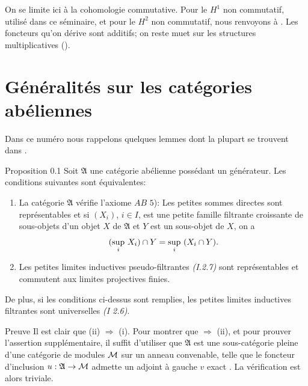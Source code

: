 \documentclass[10pt]{../fichiers-configuration-latex/smfart}
\begin{document}
On se limite ici à la cohomologie commutative. Pour le $H^1$ non
commutatif, utilisé dans ce séminaire, et pour le $H^2$ non
commutatif, nous renvoyons à \cite{SGA4-05:9}. Les foncteurs qu'on dérive sont
additifs; on reste muet sur les structures multiplicatives (\cf \cite{SGA4-05:7}).

\setcounter{section}{-1}
\section{Généralités sur les catégories abéliennes}

Dans \pageoriginale ce numéro nous rappelons quelques lemmes dont la
plupart se trouvent dans \cite{SGA4-05:11}.

\begin{enonce*}{Proposition 0.1}
Soit $\mathfrak{A}$ une catégorie abélienne possédant un
générateur. Les conditions suivantes sont équivalentes:
\begin{enumerate}
\renewcommand{\theenumi}{\roman{enumi}}
\renewcommand{\labelenumi}{\theenumi)}
\item La catégorie $\mathfrak{A}$ vérifie l'axiome $AB$ $5$): Les
  petites sommes directes sont représentables et si $(X_i)$, $i \in
  I$, est une petite famille filtrante croissante de sous-objets d'un
  objet $X$ de $\mathfrak{A}$ et $Y$ est un sous-objet de $X$, on a
$$
(\displaystyle{\sup_i}\ X_i) \cap Y = \displaystyle{\sup_i}\ (X_i \cap Y) {}.
$$
\item Les petites limites inductives pseudo-filtrantes \emph{(I.2.7)} %
sont représentables et commutent aux limites projectives finies.
\end{enumerate}

De plus, si les conditions ci-dessus sont remplies, les petites
limites inductives filtrantes sont universelles \emph{(I 2.6)}.
\end{enonce*}

\begin{enonce*}[remark]{Preuve}
Il est clair que (ii) $\Rightarrow$ (i). Pour montrer que
 $\Rightarrow$ (ii), et pour prouver l'assertion
supplémentaire, il suffit d'utiliser que $\mathfrak{A}$ est une
sous-catégorie pleine d'une catégorie de modules ${\mathcal M}$
sur un anneau convenable, telle que le foncteur d'inclusion $u :
\mathfrak{A} \rightarrow {\mathcal M}$ admette un adjoint à gauche
$v$ exact \cite{SGA4-05:5}. La vérification est alors triviale.
\end{enonce*}
\end{document}
